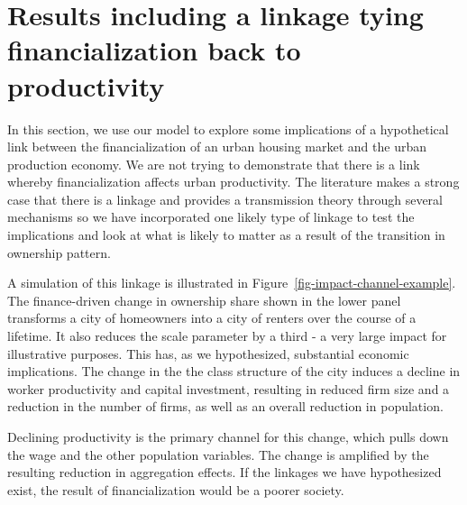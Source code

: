 \section{Results including a linkage tying financialization back to productivity}

In this section, we use our model to explore some implications of a hypothetical link between the financialization of an urban housing market and the urban production economy. We are not trying to demonstrate that there is a link whereby financialization affects urban productivity. The literature makes a strong case that there is a linkage and provides a transmission theory through several mechanisms so we have incorporated one likely type of linkage to test the implications and look at what is likely to matter as a result of the transition in ownership pattern.

A simulation of this linkage is illustrated in Figure~\ref{fig-impact-channel-example}. The finance-driven change in ownership share shown in the lower panel transforms a city of homeowners into a city of renters over the course of a lifetime. It also reduces the scale parameter by a third - a very large impact for illustrative purposes. This has, as we hypothesized, substantial economic implications. The change in the the class structure of the city induces a decline in worker productivity and capital investment, resulting in reduced firm size and a reduction in the number of firms, as well as an overall reduction in population. 

Declining productivity is the primary channel for this change, which pulls down the wage and the other population variables. The change is amplified by the resulting reduction in aggregation effects.  If the linkages we have hypothesized exist, the result of financialization would be a poorer society. 

